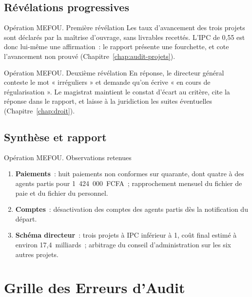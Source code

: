 \subsection{Révélations progressives}

\begin{boxscenario}{Opération MEFOU. Première révélation}
Les taux d'avancement des trois projets sont déclarés par la maîtrise
d'ouvrage, sans livrables recettés. L'IPC de 0,55 est donc lui-même une
affirmation~: le rapport présente une fourchette, et cote \NEK{}
l'avancement non prouvé (Chapitre~\ref{chap:audit-projets}).
\end{boxscenario}

\begin{boxscenario}{Opération MEFOU. Deuxième révélation}
En réponse, le directeur général conteste le mot « irréguliers » et
demande qu'on écrive « en cours de régularisation ». Le magistrat
maintient le constat d'écart au critère, cite la réponse dans le rapport,
et laisse à la juridiction les suites éventuelles
(Chapitre~\ref{chap:droit}).
\end{boxscenario}

\subsection{Synthèse et rapport}

\begin{boxscenario}{Opération MEFOU. Observations retenues}
\begin{enumerate}
    \item \textbf{Paiements}~: huit paiements non conformes sur quarante,
          dont quatre à des agents partis pour 1~424~000~FCFA~;
          rapprochement mensuel du fichier de paie et du fichier du
          personnel.
    \item \textbf{Comptes}~: désactivation des comptes des agents partis
          dès la notification du départ.
    \item \textbf{Schéma directeur}~: trois projets à IPC inférieur à 1,
          coût final estimé à environ 17,4~milliards~; arbitrage du
          conseil d'administration sur les six autres projets.
\end{enumerate}
\end{boxscenario}

\section{Grille des Erreurs d'Audit}
\label{sec:c18-erreurs}

